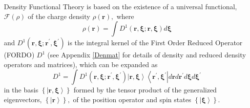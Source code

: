 \documentclass[aps,preprint]{revtex4}%
\begin{document}
Density Functional Theory is based on the existence of a universal functional,
$\mathcal{F}\left(  \rho\right)  $ \cite{HK1964} of the charge density
$\rho\left(  \boldsymbol{r}\right)  ,$ where
\begin{equation}
\rho\left(  \boldsymbol{r}\right)  =\int D^{1}\left(  \boldsymbol{r,\xi;r,\xi
}\right)  d\boldsymbol{\xi}%
\end{equation}
and $D^{1}\left(  \boldsymbol{r,\xi;r}^{\prime}\boldsymbol{,\xi}^{\prime
}\right)  $ is the integral kernel of the First Order Reduced Operator (FORDO)
$D^{1}$ (see Appendix \ref{Denmat} for details of density and reduced density
operators and matrices), which can be expanded as
\begin{equation}
D^{1}=\int D^{1}\left(  \boldsymbol{r,\xi;r}^{\prime}\boldsymbol{,\xi}%
^{\prime}\right)  \left\vert \boldsymbol{r,\xi}\right\rangle \left\langle
\boldsymbol{r}^{\prime}\boldsymbol{,\xi}^{\prime}\right\vert d\boldsymbol{r}%
d\boldsymbol{r}^{\prime}d\boldsymbol{\xi}d\boldsymbol{\xi}^{\prime}%
\end{equation}
in the basis $\left\{  \left\vert \boldsymbol{r,\xi}\right\rangle \right\}  $
formed by the tensor product of the generalized eigenvectors, $\left\{
\left\vert \boldsymbol{r}\right\rangle \right\}  ,$ of the position operator
and spin states $\left\{  \left\vert \boldsymbol{\xi}\right\rangle \right\}  $.
\end{document}
